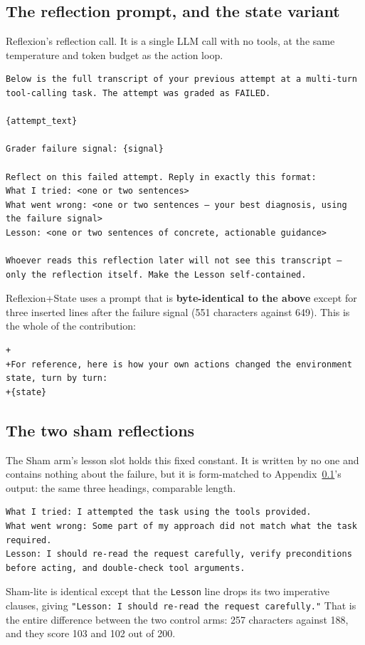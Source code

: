 \documentclass[a4paper, 12pt]{article}
\begin{document}
\subsection{The reflection prompt, and the state variant}
\label{app:reflection}
Reflexion's reflection call. It is a single LLM call with no tools, at the same
temperature and token budget as the action loop.
\begin{lstlisting}
Below is the full transcript of your previous attempt at a multi-turn tool-calling task. The attempt was graded as FAILED.

{attempt_text}

Grader failure signal: {signal}

Reflect on this failed attempt. Reply in exactly this format:
What I tried: <one or two sentences>
What went wrong: <one or two sentences — your best diagnosis, using the failure signal>
Lesson: <one or two sentences of concrete, actionable guidance>

Whoever reads this reflection later will not see this transcript — only the reflection itself. Make the Lesson self-contained.
\end{lstlisting}

\noindent
Reflexion+State uses a prompt that is \textbf{byte-identical to the above}
except for three inserted lines after the failure signal (551 characters against
649). This is the whole of the contribution:
\begin{lstlisting}
+
+For reference, here is how your own actions changed the environment state, turn by turn:
+{state}
\end{lstlisting}

\subsection{The two sham reflections}
\label{app:shams}
The Sham arm's lesson slot holds this fixed constant. It is written by no one and
contains nothing about the failure, but it is form-matched to
Appendix~\ref{app:reflection}'s output: the same three headings, comparable
length.
\begin{lstlisting}
What I tried: I attempted the task using the tools provided.
What went wrong: Some part of my approach did not match what the task required.
Lesson: I should re-read the request carefully, verify preconditions before acting, and double-check tool arguments.
\end{lstlisting}

\noindent
Sham-lite is identical except that the \texttt{Lesson} line drops its two
imperative clauses, giving \texttt{"Lesson: I should re-read the request
carefully."} That is the entire difference between the two control arms: 257
characters against 188, and they score 103 and 102 out of 200.
\end{document}
